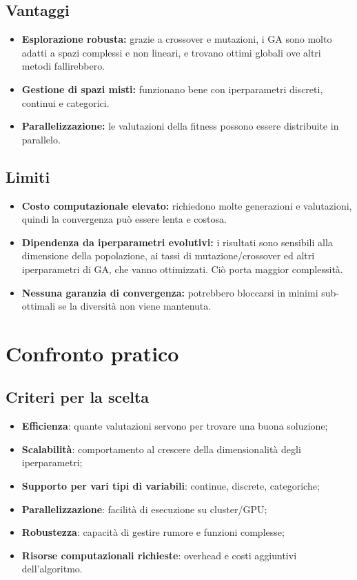 \documentclass[a4paper,12pt]{report}
\begin{document}
	\subsection{Vantaggi}
	\begin{itemize}
		\item \textbf{Esplorazione robusta:} grazie a crossover e mutazioni, i GA sono molto adatti a spazi complessi e non lineari, e trovano ottimi globali ove altri metodi fallirebbero.
		\item \textbf{Gestione di spazi misti:} funzionano bene con iperparametri discreti, continui e categorici.
		\item \textbf{Parallelizzazione:} le valutazioni della fitness possono essere distribuite in parallelo.
	\end{itemize}
	
	\subsection{Limiti}
	\begin{itemize}
		\item \textbf{Costo computazionale elevato:} richiedono molte generazioni e valutazioni, quindi la convergenza può essere lenta e costosa.
		\item \textbf{Dipendenza da iperparametri evolutivi:} i risultati sono sensibili alla dimensione della popolazione, ai tassi di mutazione/crossover ed altri iperparametri di GA, che vanno ottimizzati. Ciò porta maggior complessità.
		\item \textbf{Nessuna garanzia di convergenza:} potrebbero bloccarsi in minimi sub-ottimali se la diversità non viene mantenuta.
	\end{itemize}
	
	\section{Confronto pratico}
	
	\subsection{Criteri per la scelta}
	\begin{itemize}
		\item \textbf{Efficienza}: quante valutazioni servono per trovare una buona soluzione;
		\item \textbf{Scalabilità}: comportamento al crescere della dimensionalità degli iperparametri;
		\item \textbf{Supporto per vari tipi di variabili}: continue, discrete, categoriche;
		\item \textbf{Parallelizzazione}: facilità di esecuzione su cluster/GPU;
		\item \textbf{Robustezza}: capacità di gestire rumore e funzioni complesse;
		\item \textbf{Risorse computazionali richieste}: overhead e costi aggiuntivi dell'algoritmo.
	\end{itemize}
	
\end{document}
